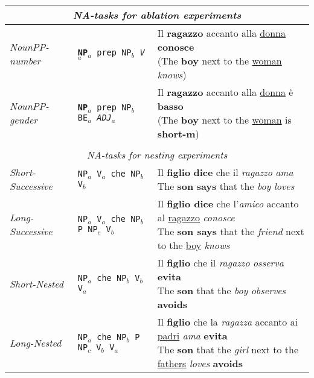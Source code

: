 \begin{table}[h]
    \setlength\tabcolsep{3mm}
\small
\centering
\begin{tabular}{lll}
\multicolumn{3}{c}{\centering \textit{NA-tasks for ablation experiments}}\\
\hline
\hline
\emph{NounPP-number} & \texttt{\textbf{NP$_a$} prep NP$_b$ \emph{V$_a$}} & \specialcell{Il \textbf{ragazzo} accanto alla \underline{donna} \textbf{conosce}\vspace{-1mm}\\({\scriptsize The \textbf{boy} next to the \underline{woman} \emph{knows}})} \\
\emph{NounPP-gender} & \texttt{\textbf{NP$_a$} prep NP$_b$ BE$_a$ \emph{ADJ$_a$}} & \specialcell{Il \textbf{ragazzo} accanto alla \underline{donna} \`{e} \textbf{basso}\vspace{-1mm}\\({\scriptsize The \textbf{boy} next to the \underline{woman} is \textbf{short-m}})}\\
\vspace{-2mm}\\
\multicolumn{3}{c}{\centering \textit{NA-tasks for nesting experiments}}\\
\hline
\hline
\emph{Short-Successive} & \texttt{NP$_a$ V$_a$ che NP$_b$ V$_b$} & \specialcell{Il \textbf{figlio} \textbf{dice} che il \emph{ragazzo} \emph{ama}\vspace{-1mm}\\{\scriptsize The \textbf{son} \textbf{says} that the \emph{boy} \emph{loves}}} \\
\emph{Long-Successive} & \texttt{NP$_a$ V$_a$ che NP$_b$ P NP$_c$ V$_b$} & \specialcell{Il \textbf{figlio dice} che l'\emph{amico} accanto al \underline{ragazzo} \emph{conosce}\vspace{-1mm}\\{\scriptsize The \textbf{son says} that the \emph{friend} next to the \underline{boy} \emph{knows}}} \\
\emph{Short-Nested} & \texttt{NP$_a$ che NP$_b$ V$_b$ V$_a$ } & \specialcell{Il \textbf{figlio} che il \emph{ragazzo} \emph{osserva} \textbf{evita}\vspace{-1mm}\\{\scriptsize The \textbf{son} that the \emph{boy} \emph{observes} \textbf{avoids}}} \\
\emph{Long-Nested} & \texttt{NP$_a$ che NP$_b$ P NP$_c$ V$_b$ V$_a$} & \specialcell{Il \textbf{figlio} che la \emph{ragazza} accanto ai \underline{padri} \emph{ama} \textbf{evita}\vspace{-1mm}\\{\scriptsize The \textbf{son} that the \emph{girl} next to the \underline{fathers} \emph{loves} \textbf{avoids}}} \\

\end{tabular}
\end{table}
